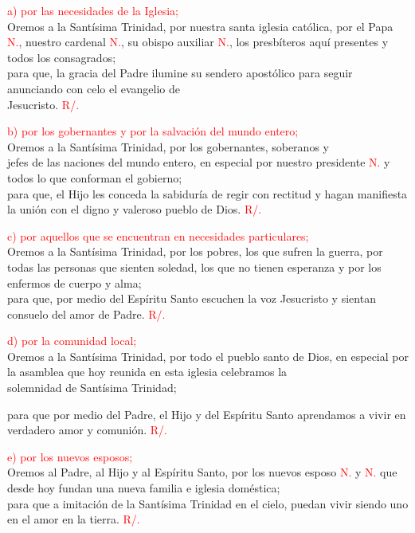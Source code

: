 \documentclass[12pt, letterpaper]{report}
\begin{document}
  \large {\textcolor{red}{a) por las necesidades de la Iglesia;}}\\
  \Large Oremos a la Sant\'isima Trinidad, por nuestra santa iglesia cat\'olica,
  por el Papa \textcolor{red}{N.}, nuestro cardenal \textcolor{red}{N.}, 
  su obispo auxiliar \textcolor{red}{N.}, los presb\'iteros aqu\'i 
  presentes y todos los consagrados;\\
  para que, la gracia del Padre ilumine su sendero apost\'olico
  para seguir anunciando con celo el evangelio de \\
  Jesucristo. \textcolor{red}{R/.}

  \large {\textcolor{red}{b) por los gobernantes y por la salvaci\'on del mundo entero;}}\\
  \Large Oremos a la Sant\'isima Trinidad, por los gobernantes, 
  soberanos y\\ jefes de las naciones del mundo entero, en especial por 
  nuestro presidente \textcolor{red}{N.} y todos lo que conforman el gobierno;\\
  para que, el Hijo les conceda la sabidur\'ia de regir con rectitud y 
  hagan manifiesta la uni\'on con el digno y valeroso pueblo de Dios.
  \textcolor{red}{R/.}

  \large {\textcolor{red}{c) por aquellos que se encuentran en necesidades particulares;}}\\
  \Large Oremos a la Sant\'isima Trinidad, por los pobres, 
  los que sufren la guerra, por todas las personas que sienten soledad, 
  los que no tienen esperanza y por los enfermos de cuerpo y alma;\\
  para que, por medio del Esp\'iritu Santo escuchen la voz Jesucristo y 
  sientan consuelo del amor de Padre.
  \textcolor{red}{R/.}

  \large {\textcolor{red}{d) por la comunidad local;}}\\
  \Large Oremos a la Sant\'isima Trinidad, por todo el pueblo santo de Dios, 
  en especial por la asamblea que hoy reunida en esta iglesia celebramos 
  la\\ solemnidad de Sant\'isima Trinidad;
  
  \clearpage

  para que por medio del Padre, 
  el Hijo y del Esp\'iritu Santo aprendamos a vivir en verdadero amor 
  y comuni\'on. \textcolor{red}{R/.}
  
  \large {\textcolor{red}{e) por los nuevos esposos;}}\\
  \Large Oremos al Padre, al Hijo y al Esp\'iritu Santo, 
  por los nuevos esposo \textcolor{red}{N.} y \textcolor{red}{N.} 
  que desde hoy fundan una nueva familia e iglesia dom\'estica;\\
  para que a imitaci\'on de la Sant\'isima Trinidad en el cielo, 
  puedan vivir siendo uno en el amor en la tierra. \textcolor{red}{R/.}
  
\end{document}
